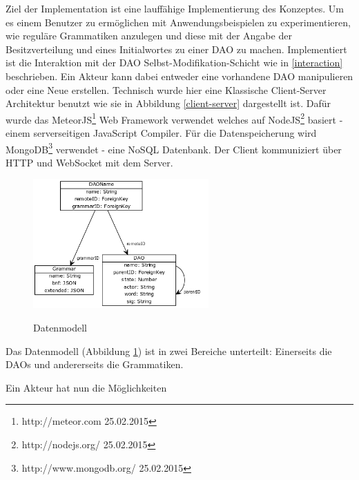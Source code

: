 \documentclass[a4paper,12pt]{report}
\begin{document}
Ziel der Implementation ist eine lauffähige Implementierung des Konzeptes. Um es einem Benutzer zu ermöglichen mit Anwendungsbeispielen zu experimentieren, wie reguläre Grammatiken anzulegen und diese mit der Angabe der Besitzverteilung und eines Initialwortes zu einer DAO zu machen.
Implementiert ist die Interaktion mit der DAO Selbst-Modifikation-Schicht wie in \ref{interaction} beschrieben. Ein Akteur kann dabei entweder eine vorhandene DAO manipulieren oder eine Neue erstellen. Technisch wurde hier eine Klassische Client-Server Architektur benutzt wie sie in Abbildung \ref{client-server} dargestellt ist. Dafür wurde das MeteorJS\footnote{http://meteor.com 25.02.2015} Web Framework verwendet
welches auf NodeJS\footnote{http://nodejs.org/ 25.02.2015} basiert - einem serverseitigen JavaScript Compiler. Für die Datenspeicherung wird MongoDB\footnote{http://www.mongodb.org/ 25.02.2015} verwendet - eine NoSQL Datenbank. Der Client kommuniziert über HTTP und WebSocket mit dem Server.


\begin{figure}[ht]
    \centering
    \includegraphics[width=0.60\textwidth]{bilder/dataModel.png}
    \label{datamodel}
    \caption{Datenmodell}
\end{figure}

Das Datenmodell (Abbildung \ref{datamodel}) ist in zwei Bereiche unterteilt: Einerseits die DAOs und andererseits die Grammatiken. 

Ein Akteur hat nun die Möglichkeiten 
\end{document}
